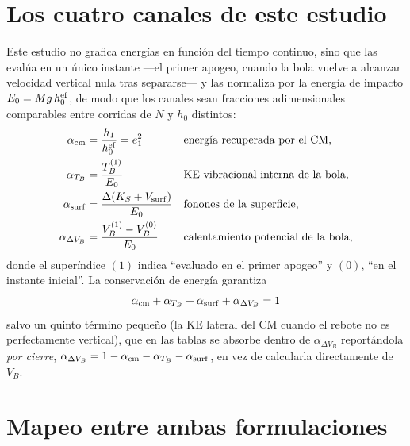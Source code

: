 \documentclass[11pt,a4paper]{article}
\begin{document}
\section{Los cuatro canales de este estudio}
\label{sec:nuestro}

Este estudio no grafica energías en función del tiempo continuo, sino que
las evalúa en un único instante ---el primer apogeo, cuando la bola vuelve
a alcanzar velocidad vertical nula tras separarse--- y las normaliza por
la energía de impacto $E_0=Mg\,h_0^{\rm ef}$, de modo que los canales sean
fracciones adimensionales comparables entre corridas de $N$ y $h_0$
distintos:
\begin{align}
    \alpha_{\rm cm}     &= \frac{h_1}{h_0^{\rm ef}} = e_1^2
        &&\text{energía recuperada por el CM,}
        \label{eq:acm}\\
    \alpha_{T_B}        &= \frac{T_B^{(1)}}{E_0}
        &&\text{KE vibracional interna de la bola,}
        \label{eq:atb}\\
    \alpha_{\rm surf}   &= \frac{\Delta(K_S + V_{\rm surf})}{E_0}
        &&\text{fonones de la superficie,}
        \label{eq:asurf}\\
    \alpha_{\Delta V_B} &= \frac{V_B^{(1)}-V_B^{(0)}}{E_0}
        &&\text{calentamiento potencial de la bola,}
        \label{eq:avb}
\end{align}
donde el superíndice $(1)$ indica ``evaluado en el primer apogeo'' y
$(0)$, ``en el instante inicial''. La conservación de energía garantiza
\begin{equation}
\alpha_{\rm cm}+\alpha_{T_B}+\alpha_{\rm surf}+\alpha_{\Delta V_B} = 1
\label{eq:cierre}
\end{equation}
salvo un quinto término pequeño (la KE lateral del CM cuando el rebote no
es perfectamente vertical), que en las tablas se absorbe dentro de
$\alpha_{\Delta V_B}$ reportándola \emph{por cierre},
$\alpha_{\Delta V_B}=1-\alpha_{\rm cm}-\alpha_{T_B}-\alpha_{\rm surf}$, en
vez de calcularla directamente de $V_B$.

\section{Mapeo entre ambas formulaciones}
\label{sec:mapeo}
\end{document}
